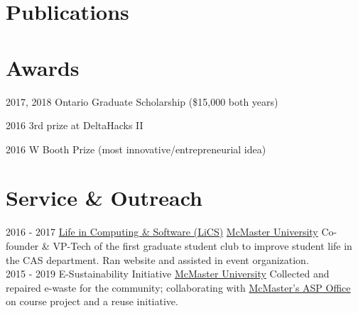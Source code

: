 \documentclass[letterpaper]{twentysecondcv} %
\begin{document}
\section{Publications}
\vspace{-.5em}
\printbibliography[heading=none]
\section{Awards}

\vspace{-.5em}
\begin{twenty}
  \twentyitem
  {2017, 2018}
  {}
  {Ontario Graduate Scholarship \textnormal{(\$15,000 both years)}}
	{}
	{}
	{}

	\twentyitem
	{2016}
	{}
	{3rd prize at DeltaHacks II}
	{}
	{}
	{}
	
	\twentyitem
	{2016}
	{}
	{W Booth Prize \textnormal{(most innovative/entrepreneurial idea)}}
	{}
	{}
	{}
\end{twenty}

\vspace{-.5em}
\section{Service \& Outreach}
\vspace{-.5em}
\begin{twenty}
	\twentyitem
	{2016 - 2017}
	{}
	{\href{https://lics.cas.mcmaster.ca/node/17}{Life in Computing \& Software (LiCS)}}
	{\href{https://www.mcmaster.ca/}{McMaster University}}
	{}
	{Co-founder \& VP-Tech of the first graduate student club to improve student life in the CAS department. Ran website and assisted in event organization.}
\\
\twentyitem
{2015 - 2019}
{}
{E-Sustainability Initiative}
{\href{https://www.mcmaster.ca/}{McMaster University}}
{}
{Collected and repaired e-waste for the community; collaborating with \href{https://asp.mcmaster.ca/}{McMaster's ASP Office} on course project and a reuse initiative.}
\end{twenty}
\end{document}
